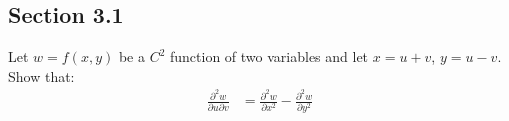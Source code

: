 \subsection{Section 3.1}

\begin{tcolorbox}[
        title={Problem 22},
        valign=center,
        nobeforeafter,
        colframe=gray!95!black
    ]
Let \(w = f(x, y)\) be a \(C^2\) function of two variables and let \(x = u + v\), \(y = u - v\). \\

Show that:
\begin{align}
    \frac{\partial^2 w}{\partial u \partial v} &= \frac{\partial^2 w}{\partial x^2} - \frac{\partial^2 w}{\partial y^2}
\end{align}
\end{tcolorbox}

